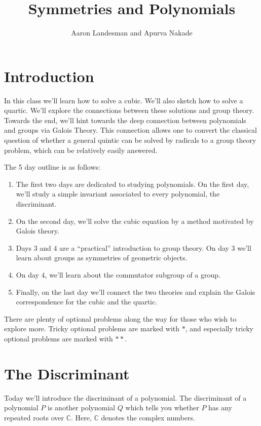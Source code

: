 \documentclass[reqno, 12pt, letter]{article}
\title{Symmetries and Polynomials}
\author{Aaron Landesman and Apurva Nakade}
\theoremstyle{plain}
\theoremstyle{definition}
\theoremstyle{remark}
\numberwithin{equation}{section}
\newcommand\bc{{\mathbb C}}
\begin{document}
\maketitle


\section*{Introduction}
In this class we'll learn how to solve a cubic. We'll also sketch how to solve a quartic. We'll explore the connections between these solutions and group theory.
Towards the end, we'll hint towards the deep connection between polynomials and groups via Galois Theory. This connection allows one to convert the classical question of whether a general quintic can be solved by radicals to a group theory problem, which can be relatively easily answered.

The 5 day outline is as follows:
\begin{enumerate}
	\item The first two days are dedicated to studying polynomials. On the first day, we'll study a simple invariant associated to every polynomial, the discriminant.
	\item On the second day, we'll solve the cubic equation by a method motivated by Galois theory.
	\item Days $3$ and $4$ are a ``practical'' introduction to group theory. On day $3$ we'll learn about groups as symmetries of geometric objects.
	\item On day $4$, we'll learn about the commutator subgroup of a group.
	\item Finally, on the last day we'll connect the two theories and explain the Galois correspondence for the cubic and the quartic.
\end{enumerate}
There are plenty of optional problems along the way for those who wish to explore more.
Tricky optional problems are marked with $*$, and especially tricky optional problems are marked with $**$.

\newpage
\section{The Discriminant}
Today we'll introduce the discriminant of a polynomial. The discriminant of a polynomial $P$ is another polynomial $Q$ which tells you
whether $P$ has any repeated roots over $\bc$.
Here, $\bc$ denotes the complex numbers.
\end{document}
